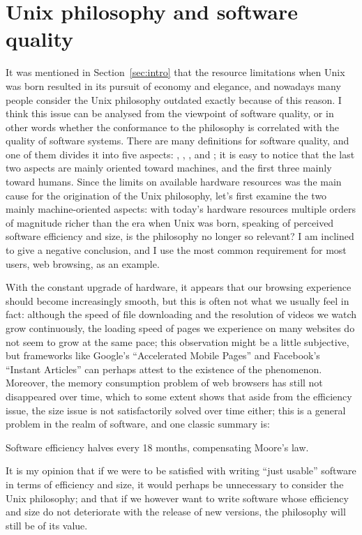 \section{Unix philosophy and software quality}\label{sec:quality}

It was mentioned in Section~\ref{sec:intro} that the resource limitations when
Unix was born resulted in its pursuit of economy and elegance, and nowadays
many people consider the Unix philosophy outdated exactly because of this
reason.  I think this issue can be analysed from the viewpoint of software
quality, or in other words whether the conformance to the philosophy is
correlated with the quality of software systems.  There are many definitions for
software quality, and one of them divides it into five
aspects: , , ,
 and ; it is easy to notice that the last two
aspects are mainly oriented toward machines, and the first three mainly toward
humans.  Since the limits on available hardware resources was the main cause
for the origination of the Unix philosophy, let's first examine the two mainly
machine-oriented aspects: with today's hardware resources multiple orders of
magnitude richer than the era when Unix was born, speaking of perceived
software efficiency and size, is the philosophy no longer so relevant?
I am inclined to give a negative conclusion, and I use the most common
requirement for most users, web browsing, as an example.

With the constant upgrade of hardware, it appears that our browsing experience
should become increasingly smooth, but this is often not what we usually feel
in fact: although the speed of file downloading and the resolution of videos
we watch grow continuously, the loading speed of pages we experience on many
websites do not seem to grow at the same pace; this observation might be a
little subjective, but frameworks like Google's ``Accelerated Mobile Pages''
and Facebook's ``Instant Articles'' can perhaps attest to the existence of
the phenomenon.  Moreover, the memory consumption problem of web browsers
has still not disappeared over time, which to some extent shows that
aside from the efficiency issue, the size issue is not satisfactorily
solved over time either; this is a general problem in the realm of
software, and one classic summary is:
\begin{quoting}
	Software efficiency halves every 18 months, compensating Moore's law.
\end{quoting}
It is my opinion that if we were to be satisfied with writing ``just usable''
software in terms of efficiency and size, it would perhaps be unnecessary to
consider the Unix philosophy; and that if we however want to write software
whose efficiency and size do not deteriorate with the release of new
versions, the philosophy will still be of its value.

